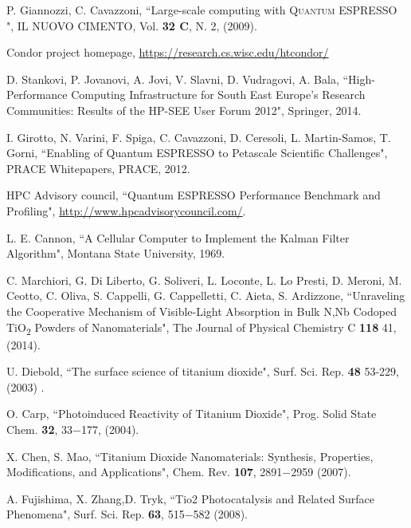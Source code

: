 \documentclass[a4paper,12pt]{article}
\newcommand\QE{\textsc{Quantum} ESPRESSO }
\begin{document}
\begin{thebibliography}{9}
P. Giannozzi, C. Cavazzoni,
``Large-scale computing with \QE",
IL NUOVO CIMENTO, Vol. \textbf{32 C}, N. 2, (2009).

Condor project homepage, \url{https://research.cs.wisc.edu/htcondor/}

D. Stankovi, P. Jovanovi, A. Jovi, V. Slavni, D. Vudragovi, A. Bala,
``High-Performance Computing Infrastructure for South East Europe's Research Communities: Results of the HP-SEE User Forum 2012",
Springer,
2014.

I. Girotto, N. Varini, F. Spiga, C. Cavazzoni, D. Ceresoli, L. Martin-Samos, T. Gorni,
``Enabling of Quantum ESPRESSO to Petascale Scientific Challenges",
PRACE Whitepapers,
PRACE,
2012.

HPC Advisory council,
``Quantum ESPRESSO Performance Benchmark and Profiling",
\url{http://www.hpcadvisorycouncil.com/}.

L. E. Cannon, 
``A Cellular Computer to Implement the Kalman Filter Algorithm",
Montana State University,
1969.

C. Marchiori, G. Di Liberto, G. Soliveri, L. Loconte, L. Lo Presti, D. Meroni, M. Ceotto, C. Oliva, S. Cappelli, G. Cappelletti, C. Aieta, S. Ardizzone,
``Unraveling the Cooperative Mechanism of Visible-Light Absorption in Bulk N,Nb Codoped TiO\textsubscript{2} Powders of Nanomaterials",
The Journal of Physical Chemistry C \textbf{118} 41, (2014).

U. Diebold,
``The surface science of titanium dioxide",
Surf. Sci. Rep. \textbf{48} 53-229, (2003) .

O. Carp, 
``Photoinduced Reactivity of Titanium Dioxide", 
Prog. Solid State Chem. \textbf{32}, 33−177, (2004).

X. Chen, S. Mao, 
``Titanium Dioxide Nanomaterials: Synthesis, Properties, Modifications, and Applications", 
Chem. Rev. \textbf{107}, 2891−2959 (2007).

A. Fujishima, X. Zhang,D. Tryk, 
``Tio2 Photocatalysis and Related Surface Phenomena", 
Surf. Sci. Rep. \textbf{63}, 515−582 (2008).

\end{thebibliography}
\end{document}
